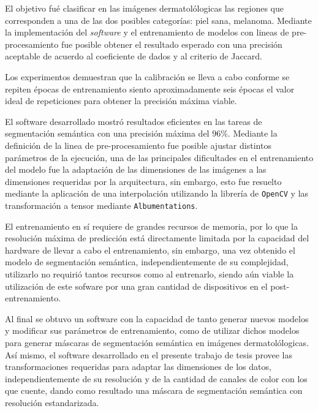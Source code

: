 El objetivo fué clasificar en las imágenes dermatolólogicas las regiones que corresponden a una de las dos posibles categorías: piel sana, melanoma. Mediante la implementación del \emph{software} y el entrenamiento de modelos con lineas de pre-procesamiento fue posible obtener el resultado esperado con una precisión aceptable de acuerdo al coeficiente de dados y al criterio de Jaccard.

Los experimentos demuestran que la calibración se lleva a cabo conforme se repiten épocas de entrenamiento siento aproximadamente seis épocas el valor ideal de repeticiones para obtener la precisión máxima viable.

El software desarrollado mostró resultados eficientes en las tareas de segmentación semántica con una precisión máxima del $96\%$. Mediante la definición de la linea de pre-procesamiento fue posible ajustar distintos parámetros de la ejecución, una de las principales dificultades en el entrenamiento del modelo fue la adaptación de las dimensiones de las imágenes a las dimensiones requeridas por la arquitectura, sin embargo, esto fue resuelto mediante la aplicación de una interpolación utilizando la librería de \texttt{OpenCV} y las transformación a tensor mediante \texttt{Albumentations}.

El entrenamiento en sí requiere de grandes recursos de memoria, por lo que la resolución máxima de predicción está directamente limitada por la capacidad del hardware de llevar a cabo el entrenamiento, sin embargo, una vez obtenido el modelo de segmentación semántica, independientemente de su complejidad, utilizarlo no requirió tantos recursos como al entrenarlo, siendo aún viable la utilización de este sofware por una gran cantidad de dispositivos en el post-entrenamiento. 


Al final se obtuvo un software con la capacidad de tanto generar nuevos modelos y modificar sus parámetros de entrenamiento, como de utilizar dichos modelos para generar máscaras de segmentación semántica en imágenes dermatolólogicas. Así mismo, el software desarrollado en el presente trabajo de tesis provee las transformaciones requeridas para adaptar las dimensiones de los datos, independientemente de su resolución y de la cantidad de canales de color con los que cuente, dando como resultado una máscara de segmentación semántica con resolución estandarizada.

